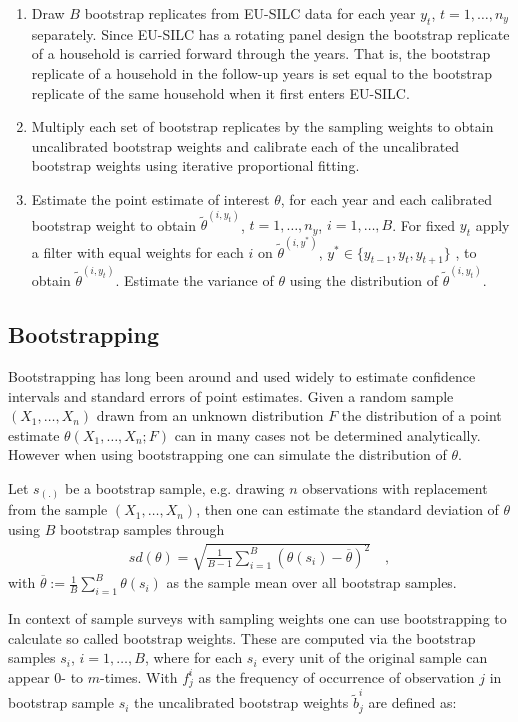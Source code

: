 \documentclass{scrartcl}\usepackage[]{graphicx}\usepackage[]{color}
\begin{document}
\begin{enumerate}
\item Draw $B$ bootstrap replicates from EU-SILC data for each year $y_t$, $t=1,\ldots,n_y$ separately. Since EU-SILC has a rotating panel design the bootstrap replicate of a household is carried forward through the years. That is, the bootstrap replicate of a household in the follow-up years is set equal to the bootstrap replicate of the same household when it first enters EU-SILC.
\item Multiply each set of bootstrap replicates by the sampling weights to obtain uncalibrated bootstrap weights and calibrate each of the uncalibrated bootstrap weights using iterative proportional fitting.
\item Estimate the point estimate of interest $\theta$, for each year and each calibrated bootstrap weight to obtain $\tilde{\theta}^{(i,y_t)}$, $t=1,\ldots,n_y$, $i=1,\ldots,B$. For fixed $y_t$ apply a filter with equal weights for each $i$ on $\tilde{\theta}^{(i,y^*)}$, $y^*\in \{y_{t-1},y_{t},y_{t+1}\}$ , to obtain $\tilde{\theta}^{(i,y_t)}$. Estimate the variance of $\theta$ using the distribution of $\tilde{\theta}^{(i,y_t)}$.
\end{enumerate}

\subsection{Bootstrapping}
Bootstrapping has long been around and used widely to estimate confidence intervals and standard errors of point estimates.\citep{efron1979}
Given a random sample $(X_1,\ldots,X_n)$ drawn from an unknown distribution $F$ the distribution of a point estimate $\theta(X_1,\ldots,X_n;F)$ can in many cases not be determined analytically. However when using bootstrapping one can simulate the distribution of $\theta$.

Let $s_{(.)}$ be a bootstrap sample, e.g. drawing $n$ observations with replacement from the sample $(X_1,\ldots,X_n)$, then one can estimate the standard deviation of $\theta$  using $B$ bootstrap samples through
\begin{align*}
  sd(\theta) = \sqrt{\frac{1}{B-1}\sum\limits_{i=1}^B (\theta(s_i)-\overline{\theta})^2} \quad,
\end{align*}
with $\overline{\theta}:=\frac{1}{B}\sum\limits_{i=1}^B\theta(s_i)$ as the sample mean over all bootstrap samples.

In context of sample surveys with sampling weights one can use bootstrapping to calculate so called bootstrap weights. These are computed via the bootstrap samples $s_{i}$, $i=1,\ldots,B$, where for each $s_{i}$ every unit of the original sample can appear $0$- to $m$-times. With $f_j^{i}$ as the frequency of occurrence of observation $j$ in bootstrap sample $s_i$ the uncalibrated bootstrap weights $\tilde{b}_{j}^{i}$ are defined as:
\end{document}
